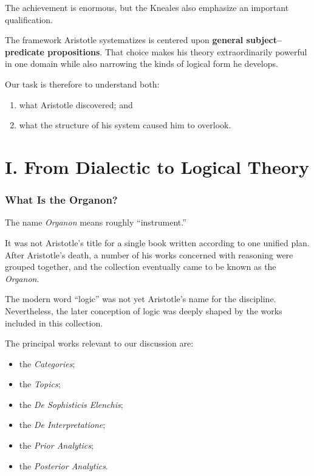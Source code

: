 \documentclass[11pt]{article}
\begin{document}
The achievement is enormous, but the Kneales also emphasize an
important qualification.

The framework Aristotle systematizes is centered upon
\textbf{general subject--predicate propositions}. That choice
makes his theory extraordinarily powerful in one domain while
also narrowing the kinds of logical form he develops.

Our task is therefore to understand both:

\begin{enumerate}
    \item what Aristotle discovered; and
    \item what the structure of his system caused him to overlook.
\end{enumerate}


\part*{I. From Dialectic to Logical Theory}

\section{What Is the Organon?}

The name \textit{Organon} means roughly ``instrument.''

It was not Aristotle's title for a single book written according
to one unified plan. After Aristotle's death, a number of his
works concerned with reasoning were grouped together, and the
collection eventually came to be known as the \textit{Organon}.

The modern word ``logic'' was not yet Aristotle's name for the
discipline. Nevertheless, the later conception of logic was deeply
shaped by the works included in this collection.

The principal works relevant to our discussion are:

\begin{itemize}
    \item the \textit{Categories};
    \item the \textit{Topics};
    \item the \textit{De Sophisticis Elenchis};
    \item the \textit{De Interpretatione};
    \item the \textit{Prior Analytics};
    \item the \textit{Posterior Analytics}.
\end{itemize}
\end{document}

